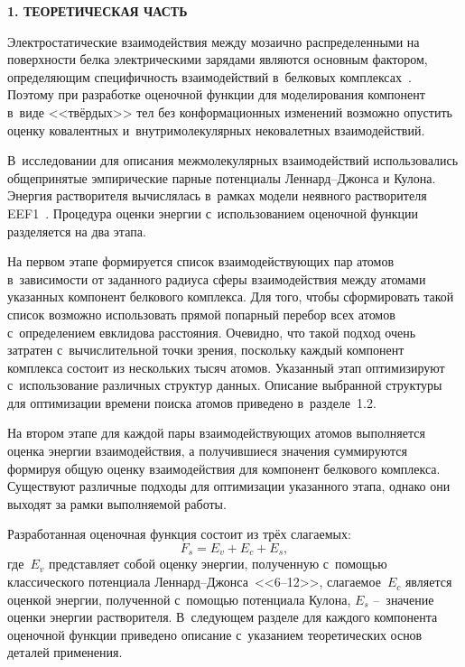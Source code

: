 \newpage
\begin{center}
  \textbf{\large 1. ТЕОРЕТИЧЕСКАЯ ЧАСТЬ}
\end{center}


Электростатические взаимодействия между мозаично распределенными на поверхности белка электрическими зарядами являются основным фактором, определяющим специфичность взаимодействий в~белковых комплексах~\cite{chrushev}. Поэтому при разработке оценочной функции для моделирования компонент в~виде <<твёрдых>> тел без конформационных изменений возможно опустить оценку ковалентных и~внутримолекулярных нековалетных взаимодействий. 

В~исследовании для описания межмолекулярных взаимодействий использовались общепринятые эмпирические парные потенциалы Леннард--Джонса и Кулона. Энергия растворителя вычислялась в~рамках модели неявного растворителя EEF1~\cite{eef1}. Процедура оценки энергии с~использованием оценочной функции разделяется на два этапа. 

На первом этапе формируется список взаимодействующих пар атомов в~зависимости от заданного радиуса сферы взаимодействия между атомами указанных компонент белкового комплекса. Для того, чтобы сформировать такой список возможно использовать прямой попарный перебор всех атомов с~определением евклидова расстояния. Очевидно, что такой подход очень затратен с~вычислительной точки зрения, поскольку каждый компонент комплекса состоит из нескольких тысяч атомов. Указанный этап оптимизируют с~использование различных структур данных. Описание выбранной структуры для оптимизации времени поиска атомов приведено в~разделе~1.2.

На втором этапе для каждой пары взаимодействующих атомов выполняется оценка энергии взаимодействия, а получившиеся значения суммируются формируя общую оценку взаимодействия для компонент белкового комплекса. Существуют различные подходы для оптимизации указанного этапа, однако они выходят за рамки выполняемой работы.

Разработанная оценочная функция состоит из трёх слагаемых:
\begin{equation}
	\displaystyle F_{s}=E_{v} + E_{c} + E_{s},
	\label{totalf}
\end{equation}
где~$E_{v}$ представляет собой оценку энергии, полученную с~помощью классического потенциала Леннард--Джонса~<<6--12>>, слагаемое~$E_{c}$ является оценкой энергии, полученной с~помощью потенциала Кулона, $E_{s}$ --~значение оценки энергии растворителя. В~следующем разделе для каждого компонента оценочной функции приведено описание с~указанием теоретических основ деталей применения. 

